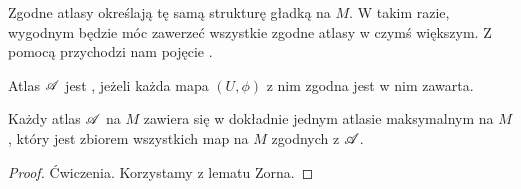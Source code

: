 Zgodne atlasy określają tę samą strukturę gładką na $M$. W takim razie, wygodnym będzie móc zawerzeć wszystkie zgodne atlasy w czymś większym. Z pomocą przychodzi nam pojęcie .
\begin{definition}
    Atlas $\mathcal{A}$ jest , jeżeli każda mapa $(U,\phi)$ z nim zgodna jest w nim zawarta.
\end{definition}

%
%
%
%

\begin{fact}
    Każdy atlas $\mathcal{A}$ na $M$ zawiera się w dokładnie jednym atlasie maksymalnym na $M$, który jest zbiorem wszystkich map na $M$ zgodnych z $\mathcal{A}$.
\begin{proof}
Ćwiczenia. Korzystamy z lematu Zorna.
\end{proof}
\end{fact}


%
%
